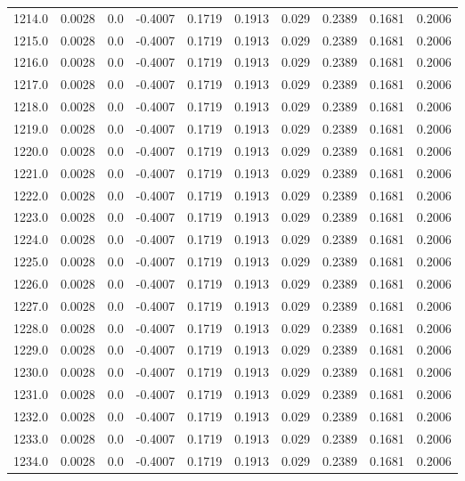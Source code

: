 \begin{longtable}{lrrrrrrrrr}
1214.0 & 0.0028 & 0.0 & -0.4007 & 0.1719 & 0.1913 & 0.029 & 0.2389 & 0.1681 & 0.2006 \\
1215.0 & 0.0028 & 0.0 & -0.4007 & 0.1719 & 0.1913 & 0.029 & 0.2389 & 0.1681 & 0.2006 \\
1216.0 & 0.0028 & 0.0 & -0.4007 & 0.1719 & 0.1913 & 0.029 & 0.2389 & 0.1681 & 0.2006 \\
1217.0 & 0.0028 & 0.0 & -0.4007 & 0.1719 & 0.1913 & 0.029 & 0.2389 & 0.1681 & 0.2006 \\
1218.0 & 0.0028 & 0.0 & -0.4007 & 0.1719 & 0.1913 & 0.029 & 0.2389 & 0.1681 & 0.2006 \\
1219.0 & 0.0028 & 0.0 & -0.4007 & 0.1719 & 0.1913 & 0.029 & 0.2389 & 0.1681 & 0.2006 \\
1220.0 & 0.0028 & 0.0 & -0.4007 & 0.1719 & 0.1913 & 0.029 & 0.2389 & 0.1681 & 0.2006 \\
1221.0 & 0.0028 & 0.0 & -0.4007 & 0.1719 & 0.1913 & 0.029 & 0.2389 & 0.1681 & 0.2006 \\
1222.0 & 0.0028 & 0.0 & -0.4007 & 0.1719 & 0.1913 & 0.029 & 0.2389 & 0.1681 & 0.2006 \\
1223.0 & 0.0028 & 0.0 & -0.4007 & 0.1719 & 0.1913 & 0.029 & 0.2389 & 0.1681 & 0.2006 \\
1224.0 & 0.0028 & 0.0 & -0.4007 & 0.1719 & 0.1913 & 0.029 & 0.2389 & 0.1681 & 0.2006 \\
1225.0 & 0.0028 & 0.0 & -0.4007 & 0.1719 & 0.1913 & 0.029 & 0.2389 & 0.1681 & 0.2006 \\
1226.0 & 0.0028 & 0.0 & -0.4007 & 0.1719 & 0.1913 & 0.029 & 0.2389 & 0.1681 & 0.2006 \\
1227.0 & 0.0028 & 0.0 & -0.4007 & 0.1719 & 0.1913 & 0.029 & 0.2389 & 0.1681 & 0.2006 \\
1228.0 & 0.0028 & 0.0 & -0.4007 & 0.1719 & 0.1913 & 0.029 & 0.2389 & 0.1681 & 0.2006 \\
1229.0 & 0.0028 & 0.0 & -0.4007 & 0.1719 & 0.1913 & 0.029 & 0.2389 & 0.1681 & 0.2006 \\
1230.0 & 0.0028 & 0.0 & -0.4007 & 0.1719 & 0.1913 & 0.029 & 0.2389 & 0.1681 & 0.2006 \\
1231.0 & 0.0028 & 0.0 & -0.4007 & 0.1719 & 0.1913 & 0.029 & 0.2389 & 0.1681 & 0.2006 \\
1232.0 & 0.0028 & 0.0 & -0.4007 & 0.1719 & 0.1913 & 0.029 & 0.2389 & 0.1681 & 0.2006 \\
1233.0 & 0.0028 & 0.0 & -0.4007 & 0.1719 & 0.1913 & 0.029 & 0.2389 & 0.1681 & 0.2006 \\
1234.0 & 0.0028 & 0.0 & -0.4007 & 0.1719 & 0.1913 & 0.029 & 0.2389 & 0.1681 & 0.2006 \\

\end{longtable}
